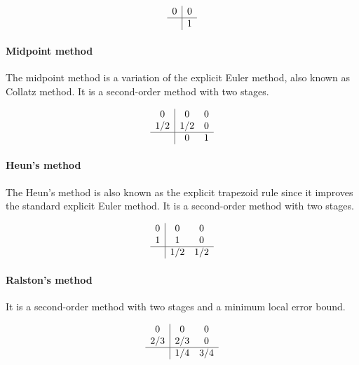 \begin{equation}
	\begin{array}{c|c}
		0 & 0 \\ \hline
		  & 1  
	\end{array}
	\label{eq::explicit_euler}
\end{equation}

\paragraph{Midpoint method}
The midpoint method is a variation of the explicit Euler method, also known as Collatz method. It is a second-order method with two stages.

\begin{equation}
	\begin{array}{c|cc}
		0   & 0   & 0 \\
		1/2 & 1/2 & 0 \\ \hline
		    & 0   & 1 
	\end{array}
	\label{eq:midpoint}
\end{equation}

\paragraph{Heun's method}
The Heun's method is also known as the explicit trapezoid rule since it improves the standard explicit Euler method. It is a second-order method with two stages.

\begin{equation}
	\begin{array}{c|cc}
		0      & 0   & 0 \\
		1      & 1   & 0 \\ \hline
		       & 1/2  & 1/2
	\end{array}
	\label{eq::heun}
\end{equation}

\paragraph{Ralston's method}
It is a second-order method with two stages and a minimum local error bound.

\begin{equation}
	\begin{array}{c|cc}
		0      & 0   & 0 \\
		2/3    & 2/3 & 0 \\ \hline
		       & 1/4 & 3/4
	\end{array}
	\label{eq::ralston}
\end{equation}

